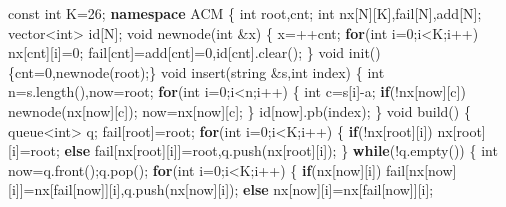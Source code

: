 \documentclass[
]{article}
\newenvironment{Shaded}{}{}
\newcommand{\AttributeTok}[1]{\textcolor[rgb]{0.49,0.56,0.16}{#1}}
\newcommand{\CharTok}[1]{\textcolor[rgb]{0.25,0.44,0.63}{#1}}
\newcommand{\ControlFlowTok}[1]{\textcolor[rgb]{0.00,0.44,0.13}{\textbf{#1}}}
\newcommand{\DataTypeTok}[1]{\textcolor[rgb]{0.56,0.13,0.00}{#1}}
\newcommand{\DecValTok}[1]{\textcolor[rgb]{0.25,0.63,0.44}{#1}}
\newcommand{\KeywordTok}[1]{\textcolor[rgb]{0.00,0.44,0.13}{\textbf{#1}}}
\newcommand{\NormalTok}[1]{#1}
\begin{document}
\begin{Shaded}
\begin{Highlighting}[]
\AttributeTok{const} \DataTypeTok{int}\NormalTok{ K=}\DecValTok{26}\NormalTok{;}
\KeywordTok{namespace}\NormalTok{ ACM}
\NormalTok{\{}
    \DataTypeTok{int}\NormalTok{ root,cnt;}
    \DataTypeTok{int}\NormalTok{ nx[N][K],fail[N],add[N];}
\NormalTok{    vector\textless{}}\DataTypeTok{int}\NormalTok{\textgreater{} id[N];}
    \DataTypeTok{void}\NormalTok{ newnode(}\DataTypeTok{int}\NormalTok{ \&x)}
\NormalTok{    \{}
\NormalTok{        x=++cnt;}
        \ControlFlowTok{for}\NormalTok{(}\DataTypeTok{int}\NormalTok{ i=}\DecValTok{0}\NormalTok{;i\textless{}K;i++)}
\NormalTok{            nx[cnt][i]=}\DecValTok{0}\NormalTok{;}
\NormalTok{        fail[cnt]=add[cnt]=}\DecValTok{0}\NormalTok{,id[cnt].clear();}
\NormalTok{    \}}
    \DataTypeTok{void}\NormalTok{ init()\{cnt=}\DecValTok{0}\NormalTok{,newnode(root);\}}
    \DataTypeTok{void}\NormalTok{ insert(string \&s,}\DataTypeTok{int}\NormalTok{ index)}
\NormalTok{    \{}
        \DataTypeTok{int}\NormalTok{ n=s.length(),now=root;}
        \ControlFlowTok{for}\NormalTok{(}\DataTypeTok{int}\NormalTok{ i=}\DecValTok{0}\NormalTok{;i\textless{}n;i++)}
\NormalTok{        \{}
            \DataTypeTok{int}\NormalTok{ c=s[i]{-}}\CharTok{\textquotesingle{}a\textquotesingle{}}\NormalTok{;}
            \ControlFlowTok{if}\NormalTok{(!nx[now][c])}
\NormalTok{                newnode(nx[now][c]);}
\NormalTok{            now=nx[now][c];}
\NormalTok{        \}}
\NormalTok{        id[now].pb(index);}
\NormalTok{    \}}
    \DataTypeTok{void}\NormalTok{ build()}
\NormalTok{    \{}
\NormalTok{        queue\textless{}}\DataTypeTok{int}\NormalTok{\textgreater{} q;}
\NormalTok{        fail[root]=root;}
        \ControlFlowTok{for}\NormalTok{(}\DataTypeTok{int}\NormalTok{ i=}\DecValTok{0}\NormalTok{;i\textless{}K;i++)}
\NormalTok{        \{}
            \ControlFlowTok{if}\NormalTok{(!nx[root][i]) nx[root][i]=root;}
            \ControlFlowTok{else}\NormalTok{ fail[nx[root][i]]=root,q.push(nx[root][i]);}
\NormalTok{        \}}
        \ControlFlowTok{while}\NormalTok{(!q.empty())}
\NormalTok{        \{}
            \DataTypeTok{int}\NormalTok{ now=q.front();q.pop();}
            \ControlFlowTok{for}\NormalTok{(}\DataTypeTok{int}\NormalTok{ i=}\DecValTok{0}\NormalTok{;i\textless{}K;i++)}
\NormalTok{            \{}
                \ControlFlowTok{if}\NormalTok{(nx[now][i])}
\NormalTok{                    fail[nx[now][i]]=nx[fail[now]][i],q.push(nx[now][i]);}
                \ControlFlowTok{else}\NormalTok{ nx[now][i]=nx[fail[now]][i];}

\end{Highlighting}
\end{Shaded}
\end{document}
